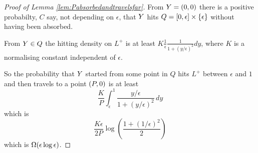 {\begin{proof}[Proof of Lemma \ref{lem:Pabsorbedandtravelsfar}]
From $Y = (0,0)$ there is a positive probabilty, $C$ say, not
depending on $\epsilon$, that $Y$ hits $Q = [0, \epsilon] \times
\{\epsilon\}$ without having been absorbed.

From $Y \in Q$ the hitting density on $L^+$ is at least $K
\frac{1}{\epsilon} \frac{1}{1 + (y/\epsilon)^2} dy$, where $K$ is a
normalising constant independent of $\epsilon$.

So the probability that $Y$ started from some point in $Q$ hits $L^+$
between $\epsilon$ and $1$ and then travels to a point $(P,0)$ is at least
\[
\frac{K}{P} \int_{\epsilon}^{1} \frac{y/\epsilon}{1 + (y/\epsilon)^2}
\, dy
\]
which is
\[
\frac{K\epsilon}{2P} \log\left(\frac{1 + (1/\epsilon)^2}{2}\right)
\]
which is $\Omega(\epsilon\log\epsilon)$.
\end{proof}
}
